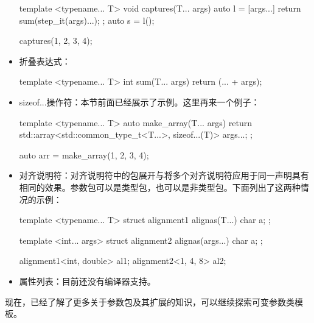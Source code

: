 \begin{itemize}
\begin{cpp}
template <typename... T>
void captures(T... args)
{
	auto l = [args...]{
		        return sum(step_it(args)...); };
	auto s = l();
}

captures(1, 2, 3, 4);
\end{cpp}
  \item 折叠表达式：

\begin{cpp}
template <typename... T>
int sum(T... args)
{
	return (... + args);
}
\end{cpp}
  \item sizeof...操作符：本节前面已经展示了示例。这里再来一个例子：

\begin{cpp}
template <typename... T>
auto make_array(T... args)
{
	return std::array<std::common_type_t<T...>,
	                  sizeof...(T)> {args...};
};

auto arr = make_array(1, 2, 3, 4);
\end{cpp}
  \item 对齐说明符：对齐说明符中的包展开与将多个对齐说明符应用于同一声明具有相同的效果。参数包可以是类型包，也可以是非类型包。下面列出了这两种情况的示例：

\begin{cpp}
template <typename... T>
struct alignment1
{
	alignas(T...) char a;
};

template <int... args>
struct alignment2
{
	alignas(args...) char a;
};

alignment1<int, double> al1;
alignment2<1, 4, 8> al2;
\end{cpp}
  \item 属性列表：目前还没有编译器支持。
\end{itemize}

现在，已经了解了更多关于参数包及其扩展的知识，可以继续探索可变参数类模板。








